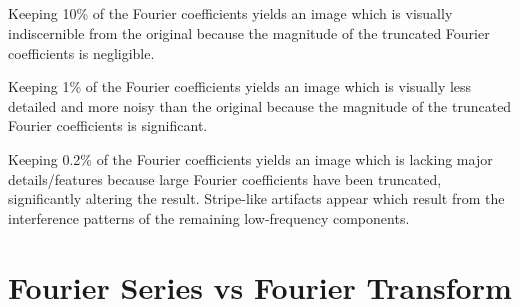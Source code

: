 \documentclass[11pt]{article}
\begin{document}
\subsection{} %
Keeping 10\% of the Fourier coefficients yields an image which is visually
indiscernible from the original because the magnitude of the truncated Fourier
coefficients is negligible.

Keeping 1\% of the Fourier coefficients yields an image which is visually
less detailed and more noisy than the original because the magnitude of the
truncated Fourier coefficients is significant.

Keeping 0.2\% of the Fourier coefficients yields an image which is lacking major
details/features because large Fourier coefficients have been truncated,
significantly altering the result. Stripe-like artifacts appear which result
from the interference patterns of the remaining low-frequency components.

\setcounter{subsection}{1} %

\section{Fourier Series vs Fourier Transform}
\end{document}
